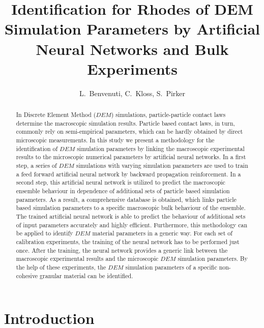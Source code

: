 \documentclass{llncs}
\begin{document}
\title{Identification for Rhodes of DEM Simulation Parameters by Artificial
Neural Networks and Bulk Experiments}

\author{L.~Benvenuti, C.~Kloss, S.~Pirker}

\maketitle

\begin{abstract}

In Discrete Element Method ($DEM$) simulations, particle-particle contact laws
determine the macroscopic simulation results. Particle based contact laws, in
turn, commonly rely on semi-empirical parameters, which can be hardly obtained
by direct microscopic measurements.
In this study we present a methodology for the identification of
$DEM$ simulation parameters by linking the macroscopic experimental results to the
microscopic numerical parameters by artificial neural networks.
In a first step, a series
of $DEM$ simulations with varying simulation parameters are used to train a feed
forward artificial neural network by backward propagation reinforcement. In a
second step, this artificial neural network is utilized to predict the
macroscopic ensemble behaviour in dependence of additional sets of particle
based simulation parameters.
As a result, a comprehensive database is obtained,
which links particle based simulation parameters to a specific macroscopic
bulk behaviour of the ensemble.
The trained artificial neural network is able to predict the behaviour of
additional sets of input parameters accurately and highly efficient.
Furthermore, this methodology can be applied to
identify $DEM$ material parameters in a generic way.
For each set of calibration experiments, the training of the neural network has
to be performed just once. 
After the training, the neural network provides a generic link between the macroscopic 
experimental results and the microscopic $DEM$ simulation parameters.
By the help of these experiments, the $DEM$ simulation parameters of a specific
non-cohesive granular material can be identified.

\end{abstract}

\section{Introduction}\label{sec:Introduction}
\end{document}
